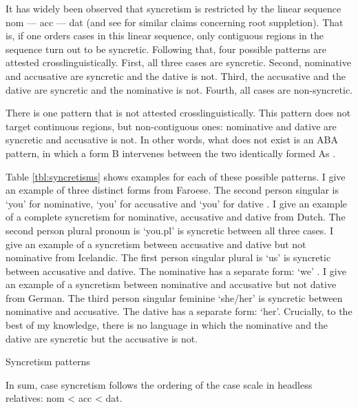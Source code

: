 It has widely been observed that syncretism is restricted by the linear sequence \ac{nom} --- \ac{acc} --- \ac{dat} \citep{baerman2005,caha2009,zompi2017} (and see \citealt{mcfadden2018,smith2019} for similar claims concerning root suppletion). That is, if one orders cases in this linear sequence, only contiguous regions in the sequence turn out to be syncretic.
Following that, four possible patterns are attested crosslinguistically. First, all three cases are syncretic. Second, nominative and accusative are syncretic and the dative is not. Third, the accusative and the dative are syncretic and the nominative is not. Fourth, all cases are non-syncretic.

There is one pattern that is not attested crosslinguistically. This pattern does not target continuous regions, but non-contiguous ones: nominative and dative are syncretic and accusative is not. In other words, what does not exist is an ABA pattern, in which a form B intervenes between the two identically formed As \citep{bobaljik2012}.

Table \ref{tbl:syncretisms} shows examples for each of these possible patterns.
I give an example of three distinct forms from Faroese. The second person singular is  `you' for nominative,  `you' for accusative and  `you' for dative .
I give an example of a complete syncretism for nominative, accusative and dative from Dutch. The second person plural pronoun is  `you.\ac{pl}' is syncretic between all three cases.
I give an example of a syncretism between accusative and dative but not nominative from Icelandic. The first person singular plural is  `us' is syncretic between accusative and dative. The nominative has a separate form:  `we' .
I give an example of a syncretism between nominative and accusative but not dative from German. The third person singular feminine  `she/her' is syncretic between nominative and accusative. The dative has a separate form:  `her'.
Crucially, to the best of my knowledge, there is no language in which the nominative and the dative are syncretic but the accusative is not.

\begin{table}[ht]
  \center
  \caption {Syncretism patterns}
    
  \label{tbl:syncretisms}
\end{table}

In sum, case syncretism follows the ordering of the case scale in headless relatives: \ac{nom} < \ac{acc} < \ac{dat}.


